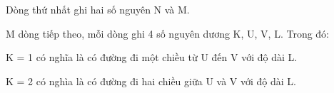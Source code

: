 Dòng thứ nhất ghi hai số nguyên N và M.  

   M dòng tiếp theo, mỗi dòng ghi 4 số nguyên dương K, U, V, L. Trong đó:  

   K = 1 có nghĩa là có đường đi một chiều từ U đến V với độ dài L.  

   K = 2 có nghìa là có đường đi hai chiều giữa U và V với độ dài L.  

\